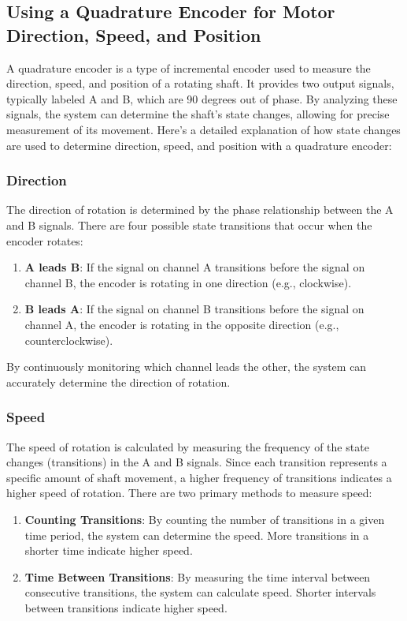 \documentclass[main.tex]{subfiles}
\begin{document}
\subsection{Using a Quadrature Encoder for Motor Direction, Speed, and Position}

A quadrature encoder is a type of incremental encoder used to measure the direction, speed, and position of a rotating shaft. It provides two output signals, typically labeled A and B, which are 90 degrees out of phase. By analyzing these signals, the system can determine the shaft's state changes, allowing for precise measurement of its movement. Here's a detailed explanation of how state changes are used to determine direction, speed, and position with a quadrature encoder:

\subsubsection{Direction}

The direction of rotation is determined by the phase relationship between the A and B signals. There are four possible state transitions that occur when the encoder rotates:

\begin{enumerate}
    \item \textbf{A leads B}: If the signal on channel A transitions before the signal on channel B, the encoder is rotating in one direction (e.g., clockwise).
    \item \textbf{B leads A}: If the signal on channel B transitions before the signal on channel A, the encoder is rotating in the opposite direction (e.g., counterclockwise).
\end{enumerate}

\noindent By continuously monitoring which channel leads the other, the system can accurately determine the direction of rotation.

\subsubsection{Speed}

The speed of rotation is calculated by measuring the frequency of the state changes (transitions) in the A and B signals. Since each transition represents a specific amount of shaft movement, a higher frequency of transitions indicates a higher speed of rotation. There are two primary methods to measure speed:

\begin{enumerate}
    \item \textbf{Counting Transitions}: By counting the number of transitions in a given time period, the system can determine the speed. More transitions in a shorter time indicate higher speed.
    \item \textbf{Time Between Transitions}: By measuring the time interval between consecutive transitions, the system can calculate speed. Shorter intervals between transitions indicate higher speed.
\end{enumerate}
\end{document}
